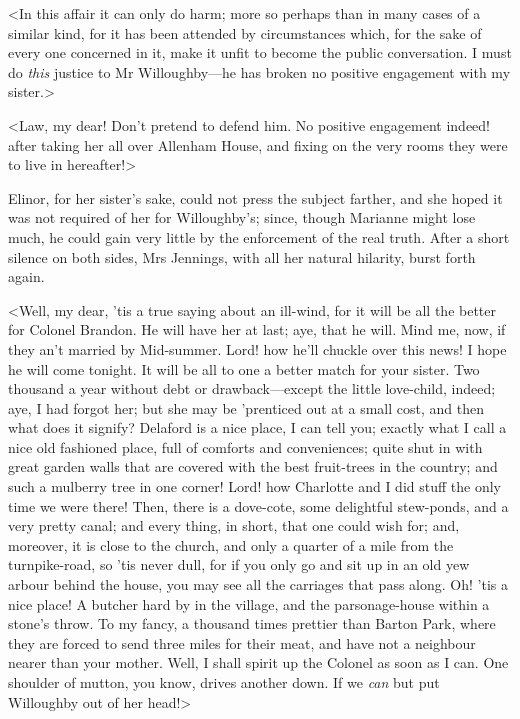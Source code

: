 <In this affair it can only do harm; more so perhaps than in many cases of a similar kind, for it has been attended by circumstances which, for the sake of every one concerned in it, make it unfit to become the public conversation. I must do \textit{this} justice to Mr Willoughby—he has broken no positive engagement with my sister.>

<Law, my dear! Don't pretend to defend him. No positive engagement indeed! after taking her all over Allenham House, and fixing on the very rooms they were to live in hereafter!>

Elinor, for her sister's sake, could not press the subject farther, and she hoped it was not required of her for Willoughby's; since, though Marianne might lose much, he could gain very little by the enforcement of the real truth. After a short silence on both sides, Mrs Jennings, with all her natural hilarity, burst forth again.

<Well, my dear, 'tis a true saying about an ill-wind, for it will be all the better for Colonel Brandon. He will have her at last; aye, that he will. Mind me, now, if they an't married by Mid-summer. Lord! how he'll chuckle over this news! I hope he will come tonight. It will be all to one a better match for your sister. Two thousand a year without debt or drawback—except the little love-child, indeed; aye, I had forgot her; but she may be 'prenticed out at a small cost, and then what does it signify? Delaford is a nice place, I can tell you; exactly what I call a nice old fashioned place, full of comforts and conveniences; quite shut in with great garden walls that are covered with the best fruit-trees in the country; and such a mulberry tree in one corner! Lord! how Charlotte and I did stuff the only time we were there! Then, there is a dove-cote, some delightful stew-ponds, and a very pretty canal; and every thing, in short, that one could wish for; and, moreover, it is close to the church, and only a quarter of a mile from the turnpike-road, so 'tis never dull, for if you only go and sit up in an old yew arbour behind the house, you may see all the carriages that pass along. Oh! 'tis a nice place! A butcher hard by in the village, and the parsonage-house within a stone's throw. To my fancy, a thousand times prettier than Barton Park, where they are forced to send three miles for their meat, and have not a neighbour nearer than your mother. Well, I shall spirit up the Colonel as soon as I can. One shoulder of mutton, you know, drives another down. If we \textit{can} but put Willoughby out of her head!>

